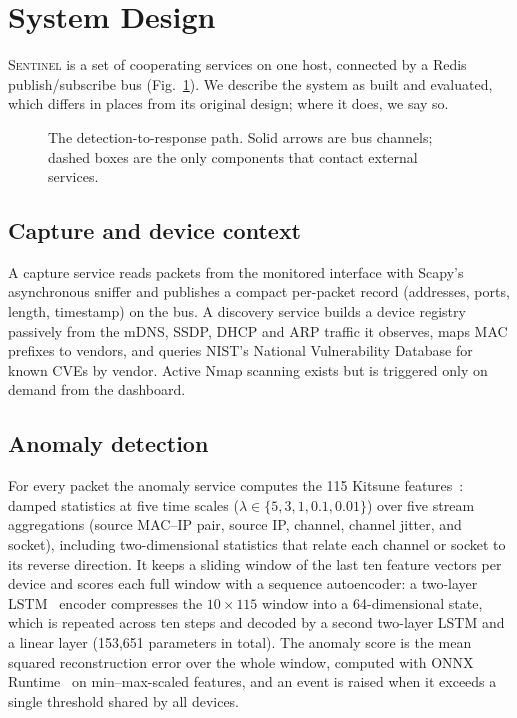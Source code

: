 \section{System Design}
\label{sec:design}

\textsc{Sentinel} is a set of cooperating services on one host, connected by
a Redis publish/subscribe bus (Fig.~\ref{fig:arch}). We describe the system as
built and evaluated, which differs in places from its original design; where
it does, we say so.

\begin{figure}[t]
\centering
\resizebox{\columnwidth}{!}{}
\caption{The detection-to-response path. Solid arrows are bus channels;
dashed boxes are the only components that contact external services.}
\label{fig:arch}
\end{figure}

\subsection{Capture and device context}
A capture service reads packets from the monitored interface with Scapy's
asynchronous sniffer and publishes a compact per-packet record (addresses,
ports, length, timestamp) on the bus. A discovery service builds a device
registry passively from the mDNS, SSDP, DHCP and ARP traffic it observes, maps
MAC prefixes to vendors, and queries NIST's National Vulnerability Database for
known CVEs by vendor. Active Nmap scanning exists but is triggered only on
demand from the dashboard.

\subsection{Anomaly detection}
For every packet the anomaly service computes the 115 Kitsune
features~\cite{mirsky2018kitsune}: damped statistics at five time scales
($\lambda \in \{5, 3, 1, 0.1, 0.01\}$) over five stream aggregations (source
MAC--IP pair, source IP, channel, channel jitter, and socket), including
two-dimensional statistics that relate each channel or socket to its reverse
direction. It keeps a sliding window of the last ten feature vectors per
device and scores each full window with a sequence autoencoder: a two-layer
LSTM~\cite{hochreiter1997lstm} encoder compresses the $10\times115$ window into
a 64-dimensional state, which is repeated across ten steps and decoded by a
second two-layer LSTM and a linear layer (153,651 parameters in total). The
anomaly score is the mean squared reconstruction error over the whole window,
computed with ONNX Runtime~\cite{onnxruntime} on min--max-scaled features, and
an event is raised when it exceeds a single threshold shared by all devices.

